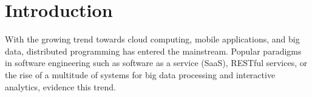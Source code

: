 \documentclass[runningheads]{llncs}
\begin{document}
\begin{sloppypar}
\begin{abstract}

\end{abstract}
%
\vspace{-3mm}
\section{Introduction}



With the growing trend towards cloud computing, mobile applications, and big data,
distributed programming has entered the mainstream. Popular paradigms in software
engineering such as software as a service (SaaS), RESTful services, or the rise
of a multitude of systems for big data processing and interactive
analytics, evidence this trend.


\end{sloppypar}
\end{document}
